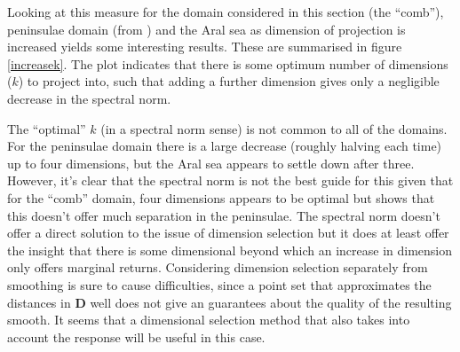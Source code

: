 Looking at this measure for the domain considered in this section (the ``comb''), peninsulae domain (from ) and the Aral sea as dimension of projection is increased yields some interesting results. These are summarised in figure \ref{increasek}. The plot indicates that there is some optimum number of dimensions ($k$) to project into, such that adding a further dimension gives only a negligible decrease in the spectral norm. 

The ``optimal'' $k$ (in a spectral norm sense) is not common to all of the domains. For the peninsulae domain there is a large decrease (roughly halving each time) up to four dimensions, but the Aral sea appears to settle down after three. However, it's clear that the spectral norm is not the best guide for this given that for the ``comb'' domain, four dimensions appears to be optimal but  shows that this doesn't offer much separation in the peninsulae. The spectral norm doesn't offer a direct solution to the issue of dimension selection but it does at least offer the insight that there is some dimensional beyond which an increase in dimension only offers marginal returns. Considering dimension selection separately from smoothing is sure to cause difficulties, since a point set that approximates the distances in $\mathbf{D}$ well does not give an guarantees about the quality of the resulting smooth. It seems that a dimensional selection method that also takes into account the response will be useful in this case.


